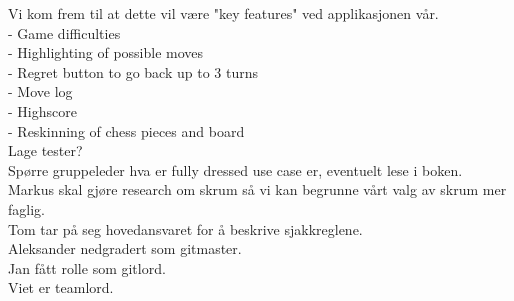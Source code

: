 \documentclass[letterpaper,11pt]{article}
\begin{document}
Vi kom frem til at dette vil være "key features" ved applikasjonen vår.\\
- Game difficulties\\
- Highlighting of possible moves\\
- Regret button to go back up to 3 turns\\	
- Move log\\
- Highscore\\
- Reskinning of chess pieces and board\\

Lage tester?\\
Spørre gruppeleder hva er fully dressed use case er, eventuelt lese i boken.\\
Markus skal gjøre research om skrum så vi kan begrunne vårt valg av skrum mer faglig.\\
Tom tar på seg hovedansvaret for å beskrive sjakkreglene.\\

Aleksander nedgradert som gitmaster.\\
Jan fått rolle som gitlord.\\
Viet er teamlord.
\end{document}
